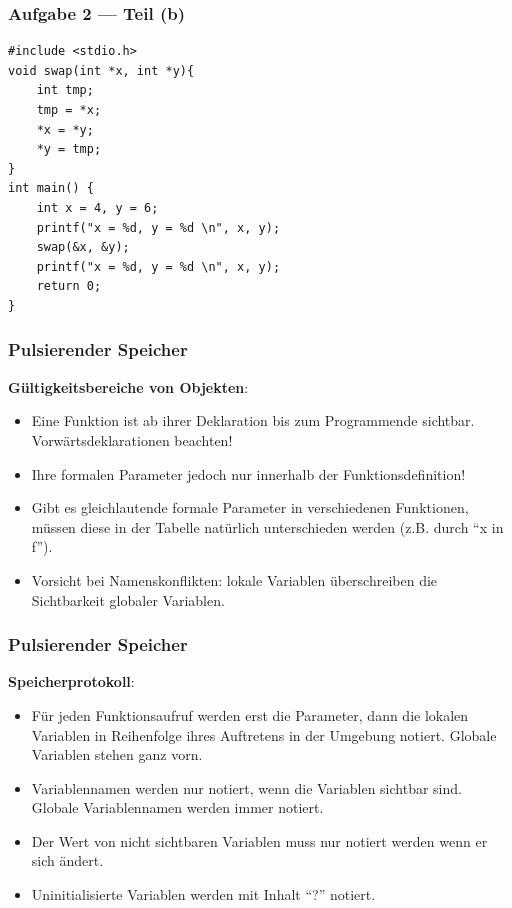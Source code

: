 \documentclass{beamer}
\begin{document}
\begin{frame}[fragile] \frametitle{Aufgabe 2 --- Teil (b)}
\begin{lstlisting}
#include <stdio.h>
void swap(int *x, int *y){ 
	int tmp;
	tmp = *x; 
	*x = *y;
	*y = tmp;
}
int main() {
	int x = 4, y = 6;
	printf("x = %d, y = %d \n", x, y);
	swap(&x, &y);
	printf("x = %d, y = %d \n", x, y);
	return 0;
}
\end{lstlisting}
\end{frame}


\begin{frame} \frametitle{Pulsierender Speicher}
	\small
	\textbf{Gültigkeitsbereiche von Objekten}:
	\begin{itemize}
		\item Eine Funktion ist ab ihrer Deklaration bis zum Programmende sichtbar. Vorwärtsdeklarationen beachten!
		\item  Ihre formalen Parameter jedoch nur innerhalb der Funktionsdefinition!
		\item Gibt es gleichlautende formale Parameter in verschiedenen Funktionen, müssen diese in der Tabelle natürlich unterschieden werden (z.B. durch \enquote{x in f}).
		\item Vorsicht bei Namenskonflikten: lokale Variablen überschreiben die Sichtbarkeit globaler Variablen.
	\end{itemize}
\end{frame}

\begin{frame} \frametitle{Pulsierender Speicher}
	\small
	\textbf{Speicherprotokoll}:
	\begin{itemize}
		\item Für jeden Funktionsaufruf werden erst die Parameter, dann die lokalen Variablen in Reihenfolge ihres Auftretens in der Umgebung notiert. Globale Variablen stehen ganz vorn.
		\item Variablennamen werden nur notiert, wenn die Variablen sichtbar sind. Globale Variablennamen werden immer notiert.
		\item Der Wert von nicht sichtbaren Variablen muss nur notiert werden wenn er sich ändert.
		\item Uninitialisierte Variablen werden mit Inhalt \enquote{?} notiert.
	\end{itemize}
\end{frame}
\end{document}
